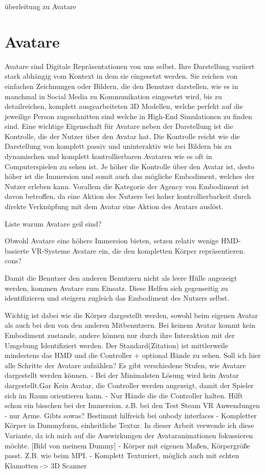 überleitung zu Avatare



\section{Avatare}
Avatare sind Digitale Repräsentationen von uns selbst. Ihre Darstellung variiert stark abhängig vom Kontext in dem sie eingesetzt werden. Sie reichen von einfachen Zeichnungen oder Bildern, die den Benutzer darstellen, wie es in manchmal in Social Media zu Kommunikation eingesetzt wird, bis zu detailreichen, komplett ausgearbeiteten 3D Modellen, welche perfekt auf die jeweilige Person zugeschnitten sind welche in High-End Simulationen zu finden sind.
Eine wichtige Eigenschaft für Avatare neben der Darstellung ist die Kontrolle, die der Nutzer über den Avatar hat. Die Kontrolle reicht wie die Darstellung von komplett passiv und uninteraktiv wie bei Bildern bis zu dynamischen und komplett kontrollierbaren Avataren wie es oft in Computerspielen zu sehen ist.
Je höher die Kontrolle über den Avatar ist, desto höher ist die Immersion und somit auch das mögliche Embodiment, welches der Nutzer erleben kann. Vorallem die Kategorie der Agency von Embodiment ist davon betroffen, da eine Aktion des Nutzers bei hoher kontrollierbarkeit durch direkte Verknüpfung mit dem Avatar eine Aktion des Avatars auslöst.\cite{Biocca2014}

Liste warum Avatare geil sind?



Obwohl Avatare eine höhere Immersion bieten, setzen relativ wenige HMD-basierte VR-Systeme Avatare ein, die den kompletten Körper repräsentieren.\cite{Pan2017} cons?



Damit die Benutzer den anderen Benutzern nicht als leere Hülle angezeigt werden, kommen Avatare zum Einsatz. Diese Helfen sich gegenseitig zu identifizieren und steigern zugleich das Embodiment des Nutzers selbst. 

Wichtig ist dabei wie die Körper dargestellt werden, sowohl beim eigenen Avatar als auch bei den von den anderen Mitbenutzern. Bei keinem Avatar kommt kein Embodiment zustande, andere können nur durch ihre Interaktion mit der Umgebung Identifiziert werden. Der Standard(Zitation) ist mittlerweile mindestens das HMD und die Controller + optional Hände zu sehen. \cite{Benford2010}
Soll ich hier alle Schritte der Avatare aufzählen?
Es gibt verschiedene Stufen, wie Avatare dargestellt werden können.
- Bei der Minimalsten Lösung wird kein Avatar dargestellt.Gar Kein Avatar, die Controller werden angezeigt, damit der Spieler sich im Raum orientieren kann.
- Nur Hände die die Controller halten. Hilft schon ein bisschen bei der Immersion. z.B. bei den Test Steam VR Anwendungen
- nur Arme. Gibts sowas? Bestimmt hilfreich bei onbody interfaces
- Kompletter Körper in Dummyform, einheitliche Textur. In dieser Arbeit verwende ich diese Variante, da ich mich auf die Auswirkungen der Avataranimationen fokussieren möchte. 
[Bild von meinem Dummy]
- Körper mit eigenen Maßen, Körpergröße passt. Z.B. wie beim MPI. 
- Komplett Texturiert, möglich auch mit echten Klamotten -> 3D Scanner

